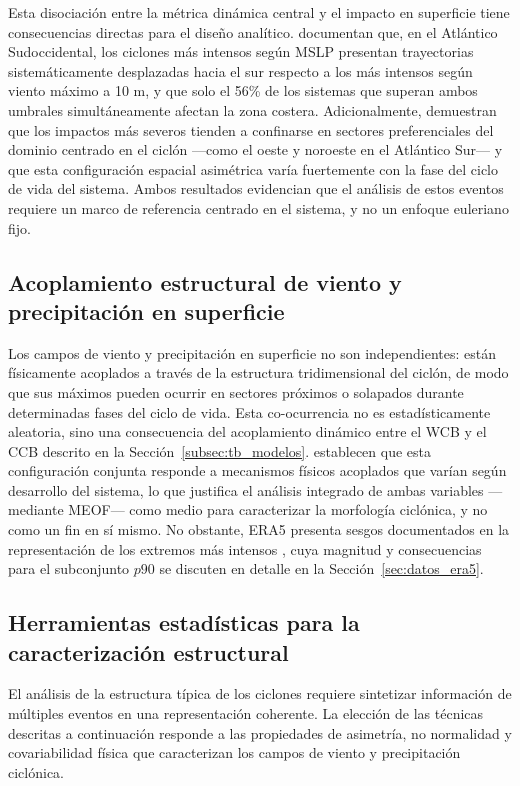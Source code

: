Esta disociación entre la métrica dinámica central y el impacto en superficie tiene consecuencias directas para el diseño analítico. \citet{andrade2024composite} documentan que, en el Atlántico Sudoccidental, los ciclones más intensos según MSLP presentan trayectorias sistemáticamente desplazadas hacia el sur respecto a los más intensos según viento máximo a 10 m, y que solo el 56\% de los sistemas que superan ambos umbrales simultáneamente afectan la zona costera. Adicionalmente, \citet{gramcianinov2023impact} demuestran que los impactos más severos tienden a confinarse en sectores preferenciales del dominio centrado en el ciclón —como el oeste y noroeste en el Atlántico Sur— y que esta configuración espacial asimétrica varía fuertemente con la fase del ciclo de vida del sistema. Ambos resultados evidencian que el análisis de estos eventos requiere un marco de referencia centrado en el sistema, y no un enfoque euleriano fijo.

\subsection{Acoplamiento estructural de viento y precipitación en superficie}\label{subsec:tb_compound_def}
Los campos de viento y precipitación en superficie no son independientes: están físicamente acoplados a través de la estructura tridimensional del ciclón, de modo que sus máximos pueden ocurrir en sectores próximos o solapados durante determinadas fases del ciclo de vida. 
Esta co-ocurrencia no es estadísticamente aleatoria, sino una consecuencia del acoplamiento dinámico entre el WCB y el CCB descrito en la Sección~\ref{subsec:tb_modelos}. 
\citet{chen2025characteristics} establecen que esta configuración conjunta responde a mecanismos físicos acoplados que varían según desarrollo del sistema, lo que justifica el análisis integrado de ambas variables —mediante MEOF— como medio para caracterizar la morfología ciclónica, y no como un fin en sí mismo.
No obstante, ERA5 presenta sesgos documentados en la representación de los extremos más intensos \citep{chen2024evaluation}, cuya magnitud y consecuencias para el subconjunto $p90$ se discuten en detalle en la Sección~\ref{sec:datos_era5}.

\subsection{Herramientas estadísticas para la caracterización estructural}\label{subsec:tb_herramientas}

El análisis de la estructura típica de los ciclones requiere sintetizar información de múltiples eventos en una representación coherente. La elección de las técnicas descritas a continuación responde a las propiedades de asimetría, no normalidad y covariabilidad física que caracterizan los campos de viento y precipitación ciclónica.


